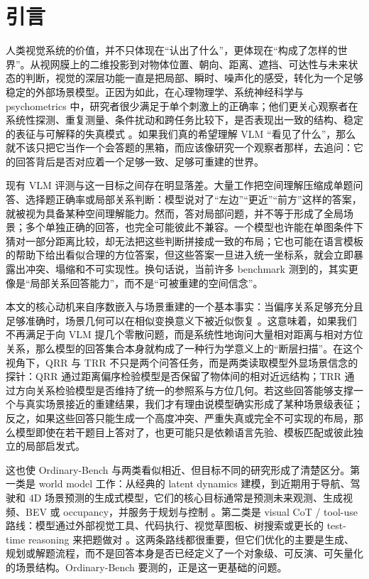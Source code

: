 \section{引言}

人类视觉系统的价值，并不只体现在“认出了什么”，更体现在“构成了怎样的世界”。从视网膜上的二维投影到对物体位置、朝向、距离、遮挡、可达性与未来状态的判断，视觉的深层功能一直是把局部、瞬时、噪声化的感受，转化为一个足够稳定的外部场景模型。正因为如此，在心理物理学、系统神经科学与 psychometrics 中，研究者很少满足于单个刺激上的正确率；他们更关心观察者在系统性探测、重复测量、条件扰动和跨任务比较下，是否表现出一致的结构、稳定的表征与可解释的失真模式 \cite{kriegeskorte2008rsa,yamins2016dicarlo,xu2025bsa,zhang2025comfort}。如果我们真的希望理解 VLM “看见了什么”，那么就不该只把它当作一个会答题的黑箱，而应该像研究一个观察者那样，去追问：它的回答背后是否对应着一个足够一致、足够可重建的世界。

现有 VLM 评测与这一目标之间存在明显落差。大量工作把空间理解压缩成单题问答、选择题正确率或局部关系判断：模型说对了“左边”“更近”“前方”这样的答案，就被视为具备某种空间理解能力。然而，答对局部问题，并不等于形成了全局场景；多个单独正确的回答，也完全可能彼此不兼容。一个模型也许能在单图条件下猜对一部分距离比较，却无法把这些判断拼接成一致的布局；它也可能在语言模板的帮助下给出看似合理的方位答案，但这些答案一旦进入统一坐标系，就会立即暴露出冲突、塌缩和不可实现性。换句话说，当前许多 benchmark 测到的，其实更像是“局部关系回答能力”，而不是“可被重建的空间信念”。

本文的核心动机来自序数嵌入与场景重建的一个基本事实：当偏序关系足够充分且足够准确时，场景几何可以在相似变换意义下被近似恢复 \cite{agarwal2007gnmds,ma2018robustordinal,dokmanic2015edm}。这意味着，如果我们不再满足于向 VLM 提几个零散问题，而是系统性地询问大量相对距离与相对方位关系，那么模型的回答集合本身就构成了一种行为学意义上的“断层扫描”。在这个视角下，QRR 与 TRR 不只是两个问答任务，而是两类读取模型外显场景信念的探针：QRR 通过距离偏序检验模型是否保留了物体间的相对近远结构；TRR 通过方向关系检验模型是否维持了统一的参照系与方位几何。若这些回答能够支撑一个与真实场景接近的重建结果，我们才有理由说模型确实形成了某种场景级表征；反之，如果这些回答只能生成一个高度冲突、严重失真或完全不可实现的布局，那么模型即使在若干题目上答对了，也更可能只是依赖语言先验、模板匹配或彼此独立的局部启发式。

这也使 Ordinary-Bench 与两类看似相近、但目标不同的研究形成了清楚区分。第一类是 world model 工作：从经典的 latent dynamics 建模，到近期用于导航、驾驶和 4D 场景预测的生成式模型，它们的核心目标通常是预测未来观测、生成视频、BEV 或 occupancy，并服务于规划与控制 \cite{ha2018worldmodels,wang2024drivewm,bar2025navigationwm,ni2025maskgwm,liao2025i2world,zhou2025hermes}。第二类是 visual CoT / tool-use 路线：模型通过外部视觉工具、代码执行、视觉草图板、树搜索或更长的 test-time reasoning 来把题做对 \cite{suris2023vipergpt,liu2023llavaplus,gui2024vpd,hu2024visualsketchpad,wang2025visuothink,lin2025multimodalcot}。这两条路线都很重要，但它们优化的主要是生成、规划或解题流程，而不是回答本身是否已经定义了一个对象级、可反演、可矢量化的场景结构。Ordinary-Bench 要测的，正是这一更基础的问题。


